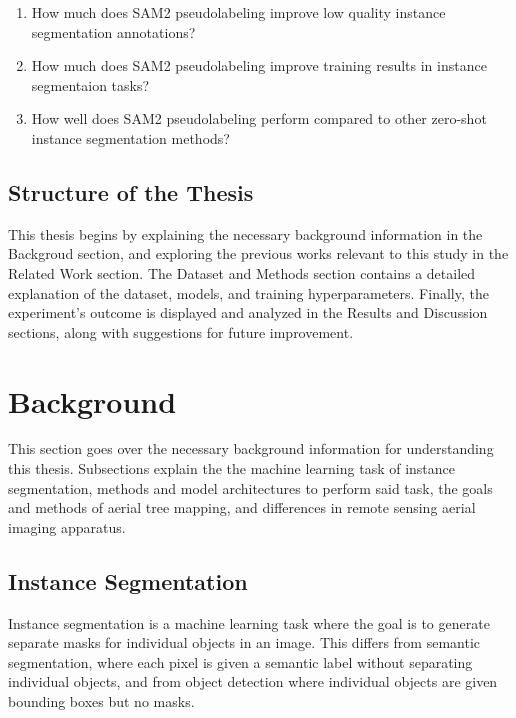 \documentclass[english, 12pt, a4paper, sci, utf8, a-2b, online]{aaltothesis}
\begin{document}
\begin{enumerate}
\item How much does SAM2 pseudolabeling improve low quality instance segmentation annotations?
\item How much does SAM2 pseudolabeling improve training results in instance segmentaion tasks?
\item How well does SAM2 pseudolabeling perform compared to other zero-shot instance segmentation methods?
\end{enumerate}

\subsection{Structure of the Thesis}

This thesis begins by explaining the necessary background information in the Backgroud section, and exploring the previous works relevant to this study in the Related Work section. The Dataset and Methods section contains a detailed explanation of the dataset, models, and training hyperparameters. Finally, the experiment's outcome is displayed and analyzed in the Results and Discussion sections, along with suggestions for future improvement.

\newpage
\section{Background}

This section goes over the necessary background information for understanding this thesis. Subsections explain the the machine learning task of instance segmentation, methods and model architectures to perform said task, the goals and methods of aerial tree mapping, and differences in remote sensing aerial imaging apparatus.

\subsection{Instance Segmentation}

Instance segmentation is a machine learning task where the goal is to generate separate masks for individual objects in an image. This differs from semantic segmentation, where each pixel is given a semantic label without separating individual objects, and from object detection where individual objects are given bounding boxes but no masks.
\newline
{}
\newline
\end{document}
